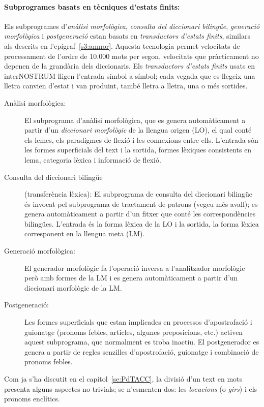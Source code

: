 \paragraph{Subprogrames basats en tècniques d'estats finits:} 
Els subprogrames d'\emph{anàlisi morfològica}, \emph{consulta del
  diccionari bilingüe}, \emph{generació morfològica} i {\em
  postgeneració} estan basats en \emph{transductors d'estats finits},
similars als descrits en l'epígraf~\ref{s3:anmor}. Aquesta
tecnologia permet velocitats de processament de l'ordre de 10.000 mots
per segon, velocitats que pràcticament no depenen de la grandària dels
diccionaris. Els \emph{transductors d'estats finits} usats en
interNOSTRUM lligen l'entrada símbol a símbol; cada vegada que es
llegeix una lletra canvien d'estat i van produint, també lletra a
lletra, una o més sortides.
\begin{description}
\item[Anàlisi morfològica:] El subprograma d'anàlisi morfològica, que es
  genera automàticament a partir d'un \emph{diccionari morfològic} de
  la llengua origen (LO), el qual conté els lemes, els paradigmes de flexió
  i les connexions entre ells. L'entrada són les formes superficials
  del text i la sortida, formes lèxiques consistents en lema, categoria
  lèxica i informació de flexió. 
\item[Consulta del diccionari bilingüe] (transferència lèxica): El subprograma de consulta del
  diccionari bilingüe és invocat pel subprograma de tractament de patrons
  (vegeu més avall); es genera automàticament a partir d'un fitxer que
  conté les correspondències bilingües. L'entrada és la forma lèxica
  de la LO i la sortida, la forma lèxica corresponent en
  la llengua meta (LM).
\item[Generació morfològica:] El generador morfològic fa l'operació
  inversa a l'analitzador morfològic però amb formes de la LM i es
  genera automàticament a partir d'un diccionari morfològic de la LM.
\item[Postgeneració:] Les formes superficials que estan implicades en
  processos d'apostrofació i guionatge (pronoms febles, articles,
  algunes preposicions, etc.) activen aquest subprograma, que
  normalment es troba inactiu. El postgenerador es genera a partir de
  regles senzilles d'apostrofació, guionatge i combinació de pronoms febles.
\end{description}
Com ja s'ha discutit en el capítol~\ref{se:PdTACC}, la divisió d'un
text en mots presenta alguns aspectes no trivials; se n'esmenten dos:
les \emph{locucions} (o \emph{girs}) i els pronoms enclítics.

